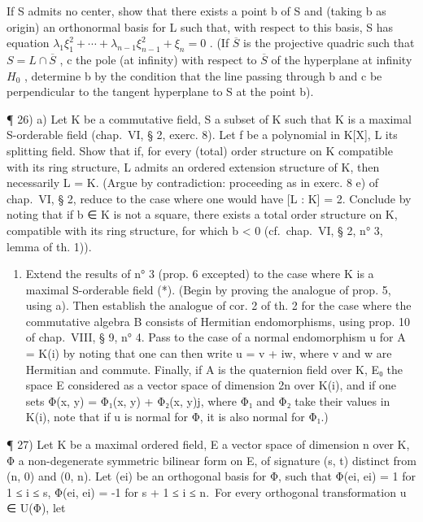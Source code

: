 If S admits no center, show that there exists a point b of S and (taking b as origin) an orthonormal basis for L such that, with respect to this basis, S has equation \(\lambda_{1}\xi_{1}^{2} + \cdots + \lambda_{n-1}\xi_{n-1}^{2} + \xi_{n} = 0\) . (If \(\overline{S}\) is the projective quadric such that \(S = L \cap \overline{S}\) , c the pole (at infinity) with respect to \(\overline{S}\) of the hyperplane at infinity \(H_{0}\) , determine b by the condition that the line passing through b and c be perpendicular to the tangent hyperplane to S at the point b).

¶ 26) a) Let K be a commutative field, S a subset of K such that K is a maximal S-orderable field (chap.~VI, § 2, exerc. 8). Let f be a polynomial in K{[}X{]}, L its splitting field. Show that if, for every (total) order structure on K compatible with its ring structure, L admits an ordered extension structure of K, then necessarily L = K. (Argue by contradiction: proceeding as in exerc. 8 e) of chap.~VI, § 2, reduce to the case where one would have {[}L : K{]} = 2. Conclude by noting that if b ∈ K is not a square, there exists a total order structure on K, compatible with its ring structure, for which b \textless{} 0 (cf.~chap.~VI, § 2, n° 3, lemma of th. 1)).

\begin{enumerate}
\def\labelenumi{\alph{enumi})}
\setcounter{enumi}{1}
\tightlist
\item
  Extend the results of n° 3 (prop. 6 excepted) to the case where K is a maximal S-orderable field (*). (Begin by proving the analogue of prop. 5, using a). Then establish the analogue of cor. 2 of th. 2 for the case where the commutative algebra B consists of Hermitian endomorphisms, using prop. 10 of chap.~VIII, § 9, n° 4. Pass to the case of a normal endomorphism u for A = K(i) by noting that one can then write u = v + iw, where v and w are Hermitian and commute. Finally, if A is the quaternion field over K, E₀ the space E considered as a vector space of dimension 2n over K(i), and if one sets Φ(x, y) = Φ₁(x, y) + Φ₂(x, y)j, where Φ₁ and Φ₂ take their values in K(i), note that if u is normal for Φ, it is also normal for Φ₁.)
\end{enumerate}

¶ 27) Let K be a maximal ordered field, E a vector space of dimension n over K, Φ a non-degenerate symmetric bilinear form on E, of signature (s, t) distinct from (n, 0) and (0, n). Let (ei) be an orthogonal basis for Φ, such that Φ(ei, ei) = 1 for 1 ≤ i ≤ s, Φ(ei, ei) = -1 for s + 1 ≤ i ≤ n.~For every orthogonal transformation u ∈ U(Φ), let

